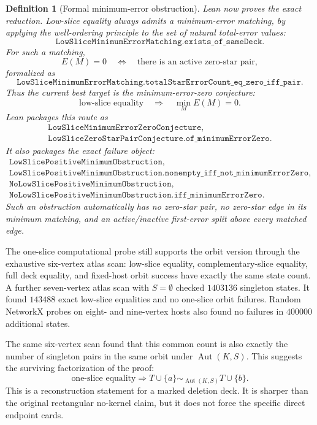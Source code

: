\documentclass[11pt]{article}
\newtheorem{definition}{Definition}
\begin{document}
\begin{definition}[Formal minimum-error obstruction]
Lean now proves the exact reduction.  Low-slice equality always admits a
minimum-error matching, by applying the well-ordering principle to the set of
natural total-error values:
\[
  \texttt{LowSliceMinimumErrorMatching.exists\_of\_sameDeck}.
\]
For such a matching,
\[
  E(M)=0
  \quad\Longleftrightarrow\quad
  \text{there is an active zero-star pair},
\]
formalized as
\[
  \texttt{LowSliceMinimumErrorMatching.totalStarErrorCount\_eq\_zero\_iff\_pair}.
\]
Thus the current best target is the minimum-error-zero conjecture:
\[
  \text{low-slice equality}\quad\Longrightarrow\quad
  \min_M E(M)=0.
\]
Lean packages this route as
\[
\begin{array}{l}
\texttt{LowSliceMinimumErrorZeroConjecture},\\
\texttt{LowSliceZeroStarPairConjecture.of\_minimumErrorZero}.
\end{array}
\]
It also packages the exact failure object:
\[
\begin{array}{l}
\texttt{LowSlicePositiveMinimumObstruction},\\
\texttt{LowSlicePositiveMinimumObstruction.nonempty\_iff\_not\_minimumErrorZero},\\
\texttt{NoLowSlicePositiveMinimumObstruction},\\
\texttt{NoLowSlicePositiveMinimumObstruction.iff\_minimumErrorZero}.
\end{array}
\]
Such an obstruction automatically has no zero-star pair, no zero-star edge in
its minimum matching, and an active/inactive first-error split above every
matched edge.
\end{definition}

The one-slice computational probe still supports the orbit version through the
exhaustive six-vertex atlas scan: low-slice equality, complementary-slice
equality, full deck equality, and fixed-host orbit success have exactly the
same state count.  A further seven-vertex atlas scan with \(S=\emptyset\)
checked \(1403136\) singleton states.  It found \(143488\) exact low-slice
equalities and no one-slice orbit failures.  Random NetworkX probes on
eight- and nine-vertex hosts also found no failures in \(400000\) additional
states.

The same six-vertex scan found that this common count is also exactly the
number of singleton pairs in the same orbit under \(\operatorname{Aut}(K,S)\).
This suggests the surviving factorization of the proof:
\[
  \text{one-slice equality}
  \Longrightarrow
  T\cup\{a\}\sim_{\operatorname{Aut}(K,S)}T\cup\{b\}.
\]
This is a reconstruction statement for a marked deletion deck.  It is sharper
than the original rectangular no-kernel claim, but it does not force the
specific direct endpoint cards.
\end{document}
